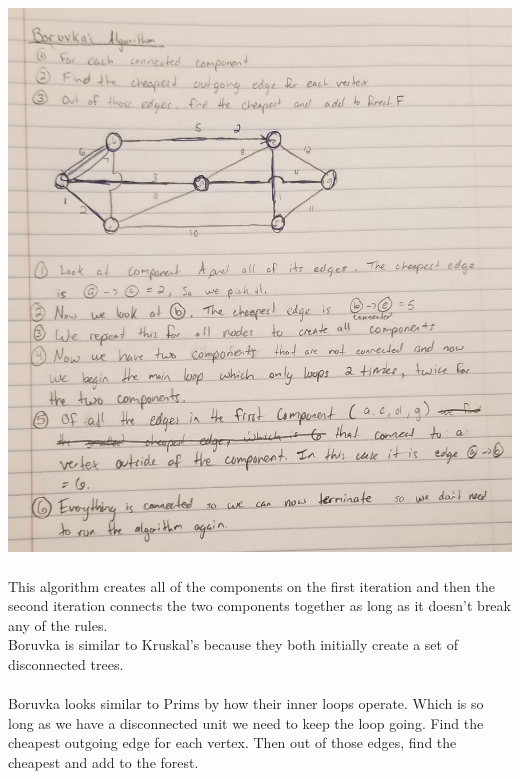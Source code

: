 \documentclass[12pt]{article}
\begin{document}
\begin{enumerate}
\includegraphics[scale=0.2]{problem3pic6.png}
\\
\\This algorithm creates all of the components on the first iteration and then the second iteration connects the two components together as long as it doesn't break any of the rules.
\\Boruvka is similar to Kruskal's because they both initially create a set of disconnected trees.\\
\\Boruvka looks similar to Prims by how their inner loops operate. Which is so long as we have a disconnected unit we need to keep the loop going. Find the cheapest outgoing edge for each vertex. Then out of those edges, find the cheapest and add to the forest.


	
	

	
\end{enumerate}
\end{document}
